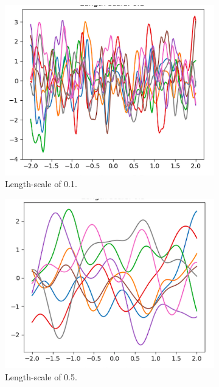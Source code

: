 \documentclass[10pt, a4paper, twocolumn]{article} %
\begin{document}
\begin{figure}[htb]
\centering
\begin{subfigure}{.5\linewidth}
  \centering
  \includegraphics[width=.9\linewidth]{ls01.png}
  \caption{Length-scale of 0.1.}
  \label{fig:sub1}
\end{subfigure}%
\begin{subfigure}{.5\linewidth}
  \centering
  \includegraphics[width=.9\linewidth]{ls05.png}
  \caption{Length-scale of 0.5.}
  \label{fig:sub2}
\end{subfigure}
\begin{subfigure}{.5\linewidth}
\centering

\end{subfigure}
\end{figure}
\end{document}
